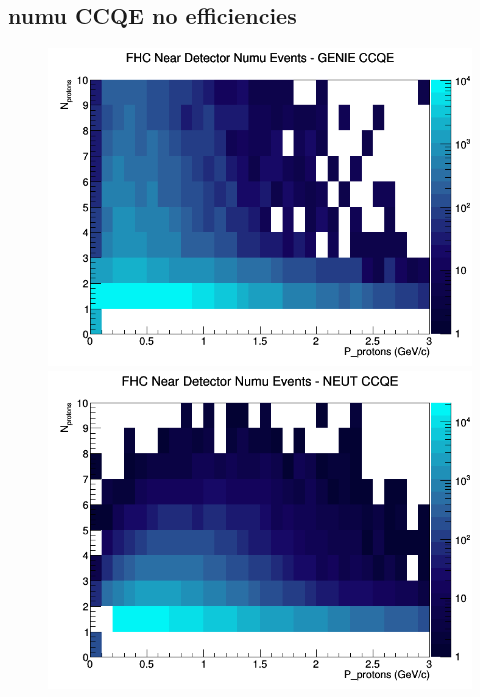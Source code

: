\documentclass[12pt]{article}
\begin{document}
\subsection{numu CCQE no efficiencies}
\begin{figure}[h]
\includegraphics[width=\linewidth]{N_P/nominal/protons/CCQE_FHC_ND_numu_N_P_GENIE.png}
\endminipage
{}
\includegraphics[width=\linewidth]{N_P/nominal/protons/CCQE_FHC_ND_numu_N_P_NEUT.png}
\endminipage
{}

\end{figure}
\end{document}
